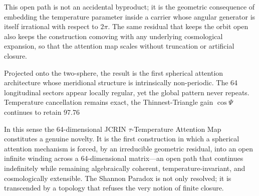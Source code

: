 This open path is not an accidental byproduct; it is the geometric consequence of embedding the temperature parameter inside a carrier whose angular generator is itself irrational with respect to \(2\pi\). The same residual that keeps the orbit open also keeps the construction comoving with any underlying cosmological expansion, so that the attention map scales without truncation or artificial closure.

Projected onto the two-sphere, the result is the first spherical attention architecture whose meridional structure is intrinsically non-periodic. The 64 longitudinal sectors appear locally regular, yet the global pattern never repeats. Temperature cancellation remains exact, the Thinnest-Triangle gain \(\cos\Psi\) continues to retain 97.76 %

In this sense the 64-dimensional JCRIN \(\tau\)-Temperature Attention Map constitutes a genuine novelty. It is the first construction in which a spherical attention mechanism is forced, by an irreducible geometric residual, into an open infinite winding across a 64-dimensional matrix—an open path that continues indefinitely while remaining algebraically coherent, temperature-invariant, and cosmologically extensible. The Shannon Paradox is not only resolved; it is transcended by a topology that refuses the very notion of finite closure.

